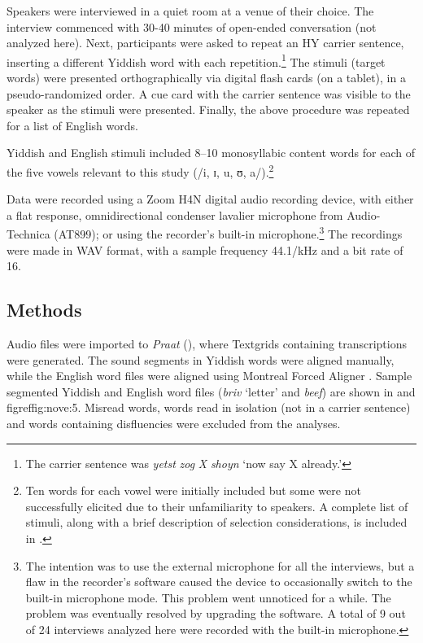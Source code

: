 \documentclass[output=paper]{langsci/langscibook}
\begin{document}
Speakers were interviewed in a quiet room at a venue of their choice. The interview commenced with 30-40 minutes of open-ended conversation (not analyzed here). Next, participants were asked to repeat an HY carrier sentence, inserting a different Yiddish word with each repetition.\footnote{The carrier sentence was \textit{yetst} \textit{zog} \textit{X} \textit{shoyn} ‘now say X already.’} The stimuli (target words) were presented orthographically via digital flash cards (on a tablet), in a pseudo-randomized order. A cue card with the carrier sentence was visible to the speaker as the stimuli were presented. Finally, the above procedure was repeated for a list of English words. 

Yiddish and English stimuli included 8--10 monosyllabic content words for each of the five vowels relevant to this study (/i, ɪ, u, ʊ, a/).\footnote{Ten words for each vowel were initially included but some were not successfully elicited due to their unfamiliarity to speakers. A complete list of stimuli, along with a brief description of selection considerations, is included in .}  

Data were recorded using a Zoom H4N digital audio recording device, with either a flat response, omnidirectional condenser lavalier microphone from Audio-Technica (AT899); or using the recorder’s built-in microphone.\footnote{The intention was to use the external microphone for all the interviews, but a flaw in the recorder’s software caused the device to occasionally switch to the built-in microphone mode. This problem went unnoticed for a while. The problem was eventually resolved by upgrading the software. A total of 9 out of 24 interviews analyzed here were recorded with the built-in microphone.}  The recordings were made in WAV format, with a sample frequency 44.1/kHz and a bit rate of 16.


 
 \subsection{Methods}
\label{sec:nove:4.2}


Audio files were imported to \textit{Praat} (\citealt{BoersmaWeenink2018}), where Textgrids containing transcriptions were generated. The sound segments in Yiddish words were aligned manually, while the English word files were aligned using Montreal Forced Aligner \citep{McAuliffeEtAl2017}. Sample segmented Yiddish and English word files (\textit{briv} ‘letter’ and \textit{beef}) are shown in  and figref{fig:nove:5}. Misread words, words read in isolation (not in a carrier sentence) and words containing disfluencies were excluded from the analyses.
\end{document}
